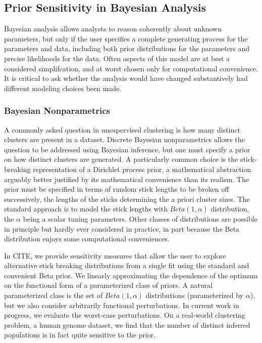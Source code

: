 \subsection*{Prior Sensitivity in Bayesian Analysis}

Bayesian analysis allows analysts to reason coherently about unknown parameters,
but only if the user specifies a complete generating process for the parameters
and data, including both prior distributions for the parameters and precise
likelihoods for the data.  Often aspects of this model are at best a considered
simplifcation, and at worst chosen only for computational convenience.  It is
critical to ask whether the analysis would have changed substantively had
different modeling choices been made.

\subsubsection*{Bayesian Nonparametrics}

A commonly asked question in unsupervised clustering is how many distinct
clusters are present in a dataset.  Discrete Bayesian nonparametrics allows the
question to be addressed using Bayesian inference, but one must specify a prior
on how distinct clusters are generated.  A particularly common choice is
the stick-breaking representation of a Dirichlet process prior, a mathematical
abstraction arguably better justified by its mathematical convenience than
its realism.  The prior must be specified in terms of random stick lengths
to be broken off successively, the lengths of the sticks determining
the a priori cluster sizes.  The standard approach is to model the stick
lengths with $Beta(1, \alpha)$ distribution, the $\alpha$ being a scalar
tuning parameters.  Other classes of distributions are possible in principle
but hardly ever considered in practice, in part because the Beta distribution
enjoys some computational conveniences.

In CITE, we provide sensitivity measures that allow the user to explore
alternative stick breaking distributions from a single fit using the standard
and convenient Beta prior.  We linearly approximating the dependence of the
optimum on the functional form of a parameterized class of priors.  A natural
parameterized class is the set of $Beta(1, \alpha)$ distributions (parameterized
by $\alpha$), but we also consider arbitrarily functional perturbations.
In current work in progress, we evaluate the worst-case perturbations.
On a real-world clustering problem, a human genome dataset, we find that
the number of distinct inferred populations is in fact quite sensitive
to the prior.


